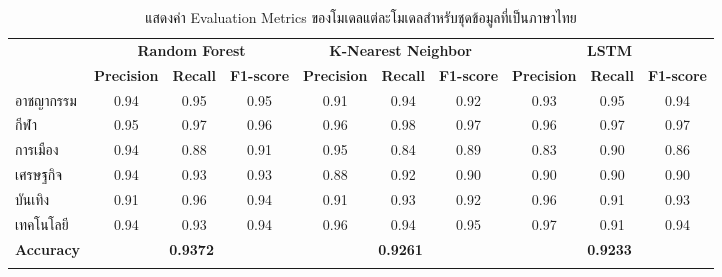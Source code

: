 \documentclass[12pt,oneside,openright,a4paper]{cpe-thai-project}
\begin{document}
      \begin{longtable}[!ht]{lccccccccc}
        \caption{แสดงค่า Evaluation Metrics ของโมเดลแต่ละโมเดลสำหรับชุดข้อมูลที่เป็นภาษาไทย}
        \label{tbl:class_report_thai}\\
        \hhline{==========}
        \multirow{2}{*}{\textbf{หมวดหมู่}} & \multicolumn{3}{c}{\textbf{Random Forest}} & \multicolumn{3}{c}{\textbf{K-Nearest Neighbor}} & \multicolumn{3}{c}{\textbf{LSTM}}   \\
         &
          \multicolumn{1}{l}{\textbf{Precision}} &
          \multicolumn{1}{l}{\textbf{Recall}} &
          \multicolumn{1}{l}{\textbf{F1-score}} &
          \multicolumn{1}{l}{\textbf{Precision}} &
          \multicolumn{1}{l}{\textbf{Recall}} &
          \multicolumn{1}{l}{\textbf{F1-score}} &
          \multicolumn{1}{l}{\textbf{Precision}} &
          \multicolumn{1}{l}{\textbf{Recall}} &
          \multicolumn{1}{l}{\textbf{F1-score}} \\ \hline
        \endhead
        \hline
        \endfoot
        \endlastfoot
        อาชญากรรม                  & 0.94        & 0.95         & 0.95         & 0.91         & 0.94         & 0.92          & 0.93       & 0.95      & 0.94      \\
        กีฬา                        & 0.95        & 0.97         & 0.96         & 0.96         & 0.98         & 0.97          & 0.96       & 0.97      & 0.97      \\
        การเมือง                    & 0.94         & 0.88         & 0.91         & 0.95         & 0.84         & 0.89          & 0.83       & 0.90      & 0.86      \\
        เศรษฐกิจ                    & 0.94         & 0.93         & 0.93         & 0.88         & 0.92         & 0.90          & 0.90       & 0.90      & 0.90      \\
        บันเทิง                      & 0.91         & 0.96         & 0.94         & 0.91         & 0.93         & 0.92          & 0.96       & 0.91      & 0.93      \\
        เทคโนโลยี                   & 0.94         & 0.93         & 0.94         & 0.96         & 0.94         & 0.95          & 0.97       & 0.91      & 0.94      \\ \hline
        \textbf{Accuracy}          & \multicolumn{3}{c}{\textbf{0.9372}}        & \multicolumn{3}{c}{\textbf{0.9261}}         & \multicolumn{3}{c}{\textbf{0.9233}} \\ \hhline{==========}
      \end{longtable}
\end{document}
